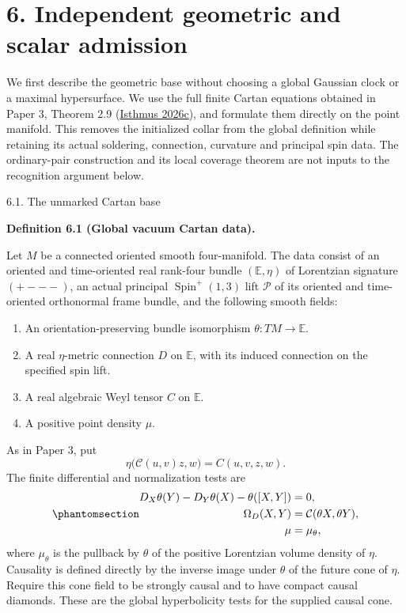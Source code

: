 \documentclass[
  english,
  11pt,
  reqno]{amsart}
\makeatletter
\providecommand{\tightlist}{%
  \setlength{\itemsep}{0pt}\setlength{\parskip}{0pt}}
\newcommand{\paperstatementsection}{\@startsection{subsection}{2}%
  \z@{.5\linespacing\@plus.7\linespacing}{.35\baselineskip}%
  {\normalfont\bfseries}}
\newcommand{\paperfirststatement}[1]{%
  {\normalfont\bfseries #1\par}%
  \nobreak\@afterindenttrue\@afterheading}
\makeatother
\begin{document}
\protect{}\label{sec:global-independent-geometric-admission}

\section{6. Independent geometric and scalar
admission}\label{independent-geometric-and-scalar-admission}

We first describe the geometric base without choosing a global Gaussian
clock or a maximal hypersurface. We use the full finite Cartan equations
obtained in Paper 3, Theorem 2.9
(\hyperref[ref-IsthmusSmooth2026]{Isthmus 2026c}), and formulate them
directly on the point manifold. This removes the initialized collar from
the global definition while retaining its actual soldering, connection,
curvature and principal spin data. The ordinary-pair construction and
its local coverage theorem are not inputs to the recognition argument
below.

\protect{}\label{sec:global-cartan-base}
\paperstatementsection{6.1. The unmarked Cartan
base}\label{the-unmarked-cartan-base}
\paperfirststatement{\protect{}\label{def:global-cartan-base}Definition 6.1 (Global vacuum Cartan data).}

Let \(M\) be a connected oriented smooth four-manifold. The data consist
of an oriented and time-oriented real rank-four bundle
\((\mathbb E,\eta)\) of Lorentzian signature \((+---)\), an actual
principal \(\operatorname{Spin}^+(1,3)\) lift \(\mathcal P\) of its
oriented and time-oriented orthonormal frame bundle, and the following
smooth fields:

\begin{enumerate}
\tightlist
\item
  An orientation-preserving bundle isomorphism
  \(\theta:TM\to\mathbb E\).
\item
  A real \(\eta\)-metric connection \(D\) on \(\mathbb E\), with its
  induced connection on the specified spin lift.
\item
  A real algebraic Weyl tensor \(C\) on \(\mathbb E\).
\item
  A positive point density \(\mu\).
\end{enumerate}

As in Paper 3, put \[
\eta\bigl(\mathcal C(u,v)z,w\bigr)=C(u,v,z,w).
\] The finite differential and normalization tests are
\begin{equation}\protect\phantomsection\label{eq:global-cartan-admission}{
\begin{aligned}
D_X\theta(Y)-D_Y\theta(X)-\theta([X,Y])&=0,\\
\Omega_D(X,Y)&=\mathcal C(\theta X,\theta Y),\\
\mu&=\mu_\theta,
\end{aligned}
}\end{equation} where \(\mu_\theta\) is the pullback by \(\theta\) of
the positive Lorentzian volume density of \(\eta\). Causality is defined
directly by the inverse image under \(\theta\) of the future cone of
\(\eta\). Require this cone field to be strongly causal and to have
compact causal diamonds. These are the global hyperbolicity tests for
the supplied causal cone.
\end{document}
